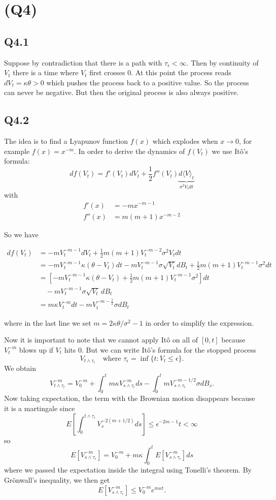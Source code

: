 \documentclass[11pt, a4paper]{article}
\begin{document}
\section*{(Q4)}

\subsection*{Q4.1} Suppose by contradiction that there is a path with $\tau_{\epsilon}<\infty$. Then by continuity of
$V_t$ there is a time where $V_t$ first crosses $0$. At this point
the process reads $dV_t = \kappa\theta > 0$ which pushes the
process back to a positive value. So the process can never be
negative. But then the original process is also always positive.

\subsection*{Q4.2} The idea is to find a Lyapunov function $f(x)$ which explodes
when $x\to 0$, for example $f(x)=x^{-m}$. In order to derive the
dynamics of $f(V_t)$ we use Itô's formula:
$$df(V_t) = f'(V_t)dV_t +\frac12 f''(V_t)\underbrace{d\langle V\rangle_t}_{\sigma^2 V_tdt}$$
with
\begin{align*}
    f'(x) &= - m x^{-m-1}\\
    f''(x) &= m(m+1)x^{-m-2}
\end{align*}

So we have

\begin{align*}
    df(V_t) 
    &= -mV_t^{-m-1}dV_t +\frac12 m(m+1)V_t^{-m-2} \sigma^2V_tdt\\
    &= -mV_t^{-m-1}\kappa (\theta - V_t)dt - mV_t^{-m-1}\sigma \sqrt{V_t}dB_t + \frac12 m(m+1)V_t^{-m-1}\sigma^2dt\\
    &= \left[-m V_t^{-m-1}\kappa(\theta -V_t) + \tfrac12 m(m+1)V_t^{-m-1}\sigma^2\right]dt\\
    &\quad - mV_t^{-m-1}\sigma\sqrt{V_t}\,dB_t\\
    &= m\kappa V_t^{-m}dt -mV_t^{-m-\frac12}\sigma dB_t
\end{align*}

where in the last line we set $m=2\kappa\theta/\sigma^2-1$ in order to simplify
the expression.

Now it is important to note that we cannot apply Itô on all of $[0,t]$ because
$V_t^{-m}$ blows up if $V_t$ hits $0$. But we can write Itô's formula
for the stopped process $$V_{t\wedge\tau_{\epsilon}}\quad\text{where }\tau_{\epsilon}=\inf\{t: V_t\le\epsilon\}.$$
We obtain $$V_{t\wedge\tau_{\epsilon}}^{-m}=V_0^{-m} + \int_0^t m\kappa V_{s\wedge\tau_{\epsilon}}^{-m}ds - \int_0^t m V_{s\wedge\tau_{\epsilon}}^{-m-1/2}\sigma dB_s.$$
Now taking expectation, the term with the Brownian motion disappears because it is a
martingale since $$E[\int_0^{t\wedge\tau_{\epsilon}} V_s^{-2(m+1/2)}ds] \le \epsilon^{-2m-1}t<\infty$$
so $$E[V_{s\wedge\tau_{\epsilon}}^{-m}]=V_0^{-m} + m\kappa\int_0^{t}E[V_{s\wedge\tau_{\epsilon}}^{-m}]ds$$ where
we passed the expectation inside the integral using Tonelli's theorem.
By Grönwall's inequality, we then get $$E[V_{s\wedge\tau_{\epsilon}}^{-m}]\le V_0^{-m}e^{m\kappa t}.$$
\end{document}
